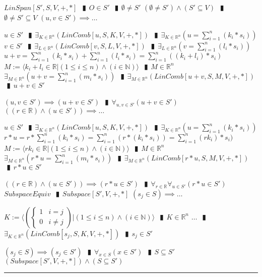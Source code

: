 \documentclass{book}
\newcommand{\abr}{:=}
\newcommand{\pipe}{$\phantom{(}\vrectangleblack\phantom{)}$}
\begin{document}
\begin{enumerate}
  \lit $LinSpan[S', S, V, +, *]$ \pipe $O \in S'$ \pipe $\emptyset \neq S'$
  \lit $(\emptyset \neq S') \land (S' \subseteq V)$ \pipe $\emptyset \neq S' \subseteq V$
  \lit $(u, v \in S') \implies \ldots$
  \begin{enumerate}
    \lit $u \in S'$ \pipe $\exists_{K \in \mathbb{R}^n}(LinComb[u, S, K, V, +, *])$ \pipe $\exists_{K \in \mathbb{R}^n}(u = \sum_{i = 1}^{n}(k_i * s_i))$
    \lit $v \in S'$ \pipe $\exists_{L \in \mathbb{R}^n}(LinComb[v, S, L, V, +, *])$ \pipe $\exists_{L \in \mathbb{R}^n}(v = \sum_{i = 1}^{n}(l_i * s_i))$
    \lit $u + v = \sum_{i = 1}^{n}(k_i * s_i) + \sum_{i = 1}^{n}(l_i * s_i) = \sum_{i = 1}^{n}((k_i + l_i) * s_i)$
    \lit $M \abr \langle k_i + l_i \in \mathbb{R} | (1 \leq i \leq n) \land (i \in \mathbb{N}) \rangle$ \pipe $M \in \mathbb{R}^n$
    \lit $\exists_{M \in \mathbb{R}^n}(u + v = \sum_{i = 1}^{n}(m_i * s_i))$ \pipe $\exists_{M \in \mathbb{R}^n}(LinComb[u + v, S, M, V, +, *])$ \pipe $u + v \in S'$
  \end{enumerate}
  \lit $(u, v \in S') \implies (u + v \in S')$ \pipe $\forall_{u, v \in S'}(u + v \in S')$
  \lit $((r \in \mathbb{R}) \land (u \in S')) \implies \ldots$
  \begin{enumerate}
    \lit $u \in S'$ \pipe $\exists_{K \in \mathbb{R}^n}(LinComb[u, S, K, V, +, *])$ \pipe $\exists_{K \in \mathbb{R}^n}(u = \sum_{i = 1}^{n}(k_i * s_i))$
    \lit $r * u = r * \sum_{i = 1}^{n}(k_i * s_i) = \sum_{i = 1}^{n}(r * (k_i * s_i)) = \sum_{i = 1}^{n}(r k_i) * s_i)$
    \lit $M \abr \langle r k_i \in \mathbb{R} | (1 \leq i \leq n) \land (i \in \mathbb{N}) \rangle$ \pipe $M \in \mathbb{R}^n$
    \lit $\exists_{M \in \mathbb{R}^n}(r * u = \sum_{i = 1}^{n}(m_i * s_i))$ \pipe $\exists_{M \in \mathbb{R}^n}(LinComb[r * u, S, M, V, +, *])$ \pipe $r * u \in S'$
  \end{enumerate}
  \lit $((r \in \mathbb{R}) \land (u \in S')) \implies (r * u \in S')$ \pipe $\forall_{r \in \mathbb{R}} \forall_{u \in S'}(r * u \in S')$
  \lit $SubspaceEquiv$ \pipe $Subspace[S', V, +, *]$
  \lit $(s_j \in S) \implies \ldots$
  \begin{enumerate}
    \lit $K \abr \langle \left(\begin{cases} 
      1 & i = j \\
      0 & i \neq j 
    \end{cases}\right) | (1 \leq i \leq n) \land (i \in \mathbb{N}) \rangle$ \pipe $K \in \mathbb{R}^n$
    \lit $\ldots$ \pipe $\exists_{K \in \mathbb{R}^n}(LinComb[s_j, S, K, V, +, *])$ \pipe $s_j \in S'$
  \end{enumerate}
  \lit $(s_j \in S) \implies (s_j \in S')$ \pipe $\forall_{x \in S}(x \in S')$ \pipe $S \subseteq S'$
  \lit $(Subspace[S', V, +, *]) \land (S \subseteq S')$
\end{enumerate} \vspace{.75mm} \hrule \vspace{.75mm} \ \\ 
\end{document}
